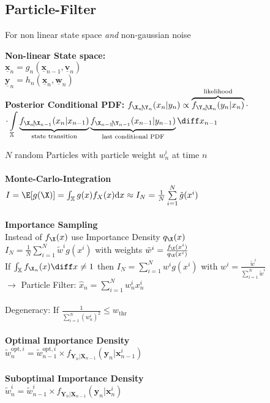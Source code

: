 \documentclass[english]{latex4ei/latex4ei_sheet}
\renewcommand{\vec}[1]{\underline{\boldsymbol{#1}}}
\begin{document}
\begin{sectionbox}
	\subsection{Particle-Filter}
	For non linear state space \emph{and} non-gaussian noise

	\textbf{Non-linear State space:}\\
	$\vec x_n = g_n(\vec x_{n−1}, \vec v_n)$\\
	$\vec y_n = h_n(\vec x_{n}, \vec w_n)$\\


	\textbf{Posterior Conditional PDF:} $f_{\X_n\!|\!\Y_n}(x_n|y_n) \propto \overbrace{ f_{\Y_n\!|\!\X_n}(y_n|x_n) }^{\text{likelihood}} \cdot$\\
	${ \displaystyle \cdot \int\limits_{\mathbb X} \underbrace{ f_{\X_n\!|\!\X_{n-1}}(x_n|x_{n-1}) }_{\text{state transition}} \underbrace{ f_{\X_{n-1}\!|\!\Y_{n-1}}(x_{n-1}|y_{n-1}) }_{\text{last conditional PDF}} \diff x_{n-1} }$


	$N$ random Particles with particle weight $w_n^i$ at time $n$\\
	\\
	\textbf{Monte-Carlo-Integration}\\
	$I = \E[g(\X)] = \int_{\mathbb{X}} g(x) f_{X}(x) \mathrm{d} x \approx I_N = \frac{1}{N} \sum\limits_{i=1}^{N} \tilde g(x^i)$\\
	\\
	\textbf{Importance Sampling}\\
	Instead of $f_{\X}(x)$ use Importance Density $q_{\X}(x)$\\
	$I_N = \frac{1}{N} \sum\limits_{i=1}^{N} \tilde w^i g(x^i)$ with weights $\tilde w^i = \frac{f_{\X}(x^i)}{q_{\X}(x^i)}$\\
	If $\int_{\mathbb{X}} f_{\X_n}(x) \diff x \ne 1$ then $I_N = \sum\limits_{i=1}^{N} w^i g(x^i)$ with $w^i = \frac{\tilde w^i}{\sum\limits_{i=1}^{N} \tilde w^i}$\\
	$\rightarrow$ Particle Filter: $\hat x_n = \sum_{i=1}^{N} w_n^i x_n^i$\\
	\\
	Degeneracy: If $\frac{1}{\sum_{i=1}^{N}\left(w_{n}^{i}\right)^{2}} \leq w_{\text {thr }}$\\
	\\
	\textbf{Optimal Importance Density}\\
	$\tilde{w}_{n}^{\mathrm{opt}, i}=\tilde{w}_{n-1}^{\mathrm{opt}, i} \times f_{\boldsymbol{Y}_{n} | \boldsymbol{X}_{n-1}}\left(\boldsymbol{y}_{n} | \boldsymbol{x}_{n-1}^{i}\right)$\\
	\\
	\textbf{Suboptimal Importance Density}\\
	$\tilde{w}_{n}^{i}=\tilde{w}_{n-1}^{i} \times f_{\boldsymbol{Y}_{n} | \boldsymbol{X}_{n-1}}\left(\boldsymbol{y}_{n} | \boldsymbol{x}_{n}^{i}\right)$\\
\end{sectionbox}



\end{document}
